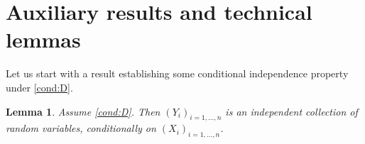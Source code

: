 \documentclass[paper=a4, fontsize=11pt]{scrartcl}
\newcommand{\PP}{\mathbb{P}}
\newtheorem{lemma}[theorem]{Lemma}
\begin{document}



\section{Auxiliary results and technical lemmas}

Let us start with a result establishing some conditional independence property under \ref{cond:D}.

\begin{lemma}\label{lemmaA}
    Assume \ref{cond:D}. Then $(Y_i) _{i = 1,\ldots, n} $ is an independent collection of random variables, conditionally on $(X_i)_{i = 1,\ldots, n}$. 
\end{lemma}
\end{document}

